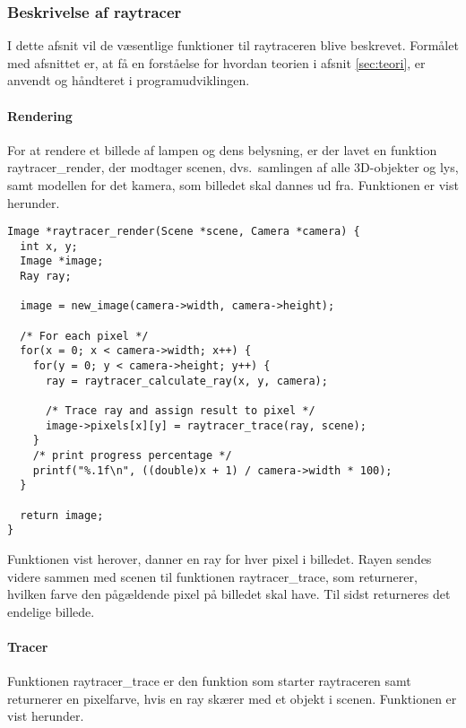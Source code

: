 \subsubsection{Beskrivelse af raytracer}
I dette afsnit vil de væsentlige funktioner til raytraceren blive beskrevet. Formålet med afsnittet er, at få en forståelse for hvordan teorien i afsnit \ref{sec:teori}, er anvendt og håndteret i programudviklingen.


\paragraph{Rendering}
For at rendere et billede af lampen og dens belysning, er der lavet en funktion raytracer\_render, der modtager scenen, dvs.\ samlingen af alle 3D-objekter og lys, samt modellen for det kamera, som billedet skal dannes ud fra. Funktionen er vist herunder.

\begin{lstlisting}[style=Cstyle, caption=Funktionen, der rendere billedet af scenen med et kameras perspektiv]
Image *raytracer_render(Scene *scene, Camera *camera) {
  int x, y;
  Image *image;
  Ray ray;

  image = new_image(camera->width, camera->height);
  
  /* For each pixel */
  for(x = 0; x < camera->width; x++) {
    for(y = 0; y < camera->height; y++) {
      ray = raytracer_calculate_ray(x, y, camera);

      /* Trace ray and assign result to pixel */
      image->pixels[x][y] = raytracer_trace(ray, scene);
    }
    /* print progress percentage */
    printf("%.1f\n", ((double)x + 1) / camera->width * 100);
  }

  return image;
}
\end{lstlisting}

Funktionen vist herover, danner en ray for hver pixel i billedet. Rayen sendes videre sammen med scenen til funktionen raytracer\_trace, som returnerer, hvilken farve den pågældende pixel på billedet skal have. Til sidst returneres det endelige billede.

\paragraph{Tracer}
Funktionen raytracer\_trace er den funktion som starter raytraceren samt returnerer en pixelfarve, hvis en ray skærer med et objekt i scenen. Funktionen er vist herunder.  

